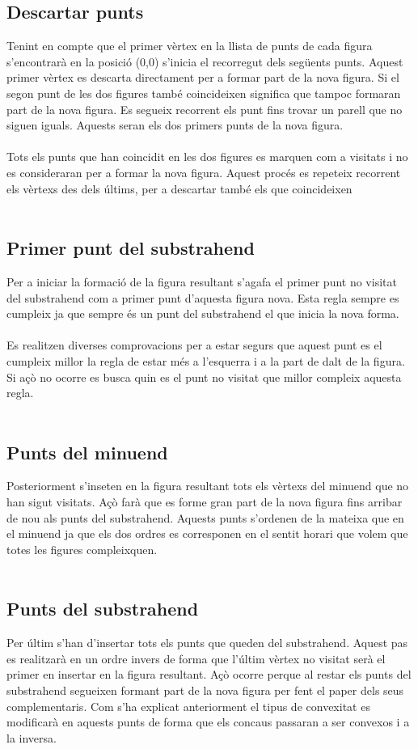 \documentclass{article}
\begin{document}
\subsection{Descartar punts}
Tenint en compte que el primer vèrtex en la llista de punts de cada figura s'encontrarà en la posició (0,0) s'inicia el recorregut dels següents punts.
Aquest primer vèrtex es descarta directament per a formar part de la nova figura.
Si el segon punt de les dos figures també coincideixen significa que tampoc formaran part de la nova figura.
Es segueix recorrent els punt fins trovar un parell que no siguen iguals.
Aquests seran els dos primers punts de la nova figura.
\\
\\
Tots els punts que han coincidit en les dos figures es marquen com a visitats i no es consideraran per a formar la nova figura. 
Aquest procés es repeteix recorrent els vèrtexs des dels últims, per a descartar també els que coincideixen  
\\
\\
\subsection{Primer punt del substrahend}
Per a iniciar la formació de la figura resultant s'agafa el primer punt no visitat del substrahend com a primer punt d'aquesta figura nova.
Esta regla sempre es cumpleix ja que sempre és un punt del substrahend el que inicia la nova forma.
\\
\\
Es realitzen diverses comprovacions per a estar segurs que aquest punt es el cumpleix millor la regla de estar més a l'esquerra i a la part de dalt de la figura.
Si açò no ocorre es busca quin es el punt no visitat que millor compleix aquesta regla. 
\\
\\
\subsection{Punts del minuend}
Posteriorment s'inseten en la figura resultant tots els vèrtexs del minuend que no han sigut visitats.
Açò farà que es forme gran part de la nova figura fins arribar de nou als punts del substrahend.
Aquests punts s'ordenen de la mateixa que en el minuend ja que els dos ordres es corresponen en el sentit horari que volem que totes les figures compleixquen.
\\
\\
\subsection{Punts del substrahend}
Per últim s'han d'insertar tots els punts que queden del substrahend.
Aquest pas es realitzarà en un ordre invers de forma que l'últim vèrtex no visitat serà el primer en insertar en la figura resultant.
Açò ocorre perque al restar els punts del substrahend segueixen formant part de la nova figura per fent el paper dels seus complementaris.
Com s'ha explicat anteriorment el tipus de convexitat es modificarà en aquests punts de forma que els concaus passaran a ser convexos i a la inversa.
\\
\\
\end{document}
